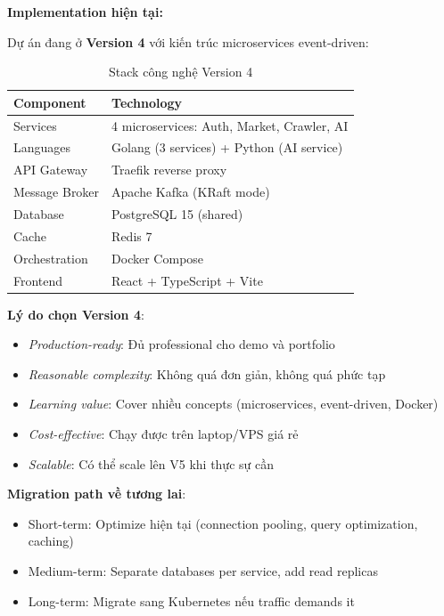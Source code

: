 \noindent\textbf{Implementation hiện tại:}

Dự án đang ở \textbf{Version 4} với kiến trúc microservices event-driven:

\begin{table}[H]
\centering
\caption{Stack công nghệ Version 4}
\begin{tabular}{|l|l|}
\hline
\textbf{Component} & \textbf{Technology} \\
\hline
Services & 4 microservices: Auth, Market, Crawler, AI \\
\hline
Languages & Golang (3 services) + Python (AI service) \\
\hline
API Gateway & Traefik reverse proxy \\
\hline
Message Broker & Apache Kafka (KRaft mode) \\
\hline
Database & PostgreSQL 15 (shared) \\
\hline
Cache & Redis 7 \\
\hline
Orchestration & Docker Compose \\
\hline
Frontend & React + TypeScript + Vite \\
\hline
\end{tabular}
\end{table}

\textbf{Lý do chọn Version 4}:
\begin{itemize}
    \item \textit{Production-ready}: Đủ professional cho demo và portfolio
    \item \textit{Reasonable complexity}: Không quá đơn giản, không quá phức tạp
    \item \textit{Learning value}: Cover nhiều concepts (microservices, event-driven, Docker)
    \item \textit{Cost-effective}: Chạy được trên laptop/VPS giá rẻ
    \item \textit{Scalable}: Có thể scale lên V5 khi thực sự cần
\end{itemize}

\textbf{Migration path về tương lai}:
\begin{itemize}
    \item Short-term: Optimize hiện tại (connection pooling, query optimization, caching)
    \item Medium-term: Separate databases per service, add read replicas
    \item Long-term: Migrate sang Kubernetes nếu traffic demands it
\end{itemize}
